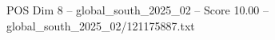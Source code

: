 \begin{textsample}{POS Dim 8 – global\_south\_2025\_02 – Score 10.00 – global\_south\_2025\_02/121175887.txt}
\end{textsample}
